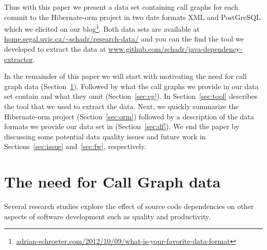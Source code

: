 \documentclass[conference]{IEEEtran}
\begin{document}
Thus with this paper we present a data set containing call graphs for each commit to the Hibernate-orm project in two date formats XML and PostGreSQL which we elicited on our blog\footnote{\url{adrian-schroeter.com/2012/10/09/what-is-your-favorite-data-format}}.
Both data sets are available at \url{home.segal.uvic.ca/~schadr/research-data/} and you can the find the tool we developed to extract the data at \url{www.github.com/schadr/java-dependency-extractor}.

%

In the remainder of this paper we will start with motivating the need for call graph data (Section~\ref{sec:need}).
Followed by what the call graphs we provide in our data set contain and what they omit (Section~\ref{sec:cg}).
In Section~\ref{sec:tool} describes the tool that we used to extract the data.
Next, we quickly summarize the Hibernate-orm project (Section~\ref{sec:orm}) followed by a description of the data formats we provide our data set in (Section~\ref{sec:df}).
We end the paper by discussing some potential data quality issues and future work in Sections~\ref{sec:issue} and~\ref{sec:fw}, respectively.

\section{The need for Call Graph data}
\label{sec:need}
Several research studies explore the effect of source code dependencies on other aspects of software development such as quality and productivity.
\end{document}
